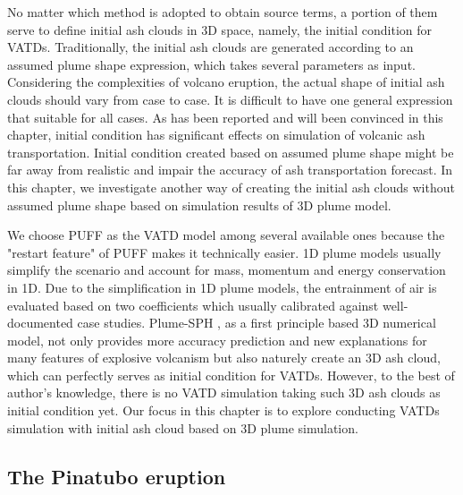 No matter which method is adopted to obtain source terms, a portion of them serve to define initial ash clouds in 3D space, namely, the initial condition for VATDs. Traditionally, the initial ash clouds are generated according to an assumed plume shape expression, which takes several parameters as input. Considering the complexities of volcano eruption, the actual shape of initial ash clouds should vary from case to case. It is difficult to have one general expression that suitable for all cases. As has been reported and will been convinced in this chapter, initial condition has significant effects on simulation of volcanic ash transportation. Initial condition created based on assumed plume shape might be far away from realistic and impair the accuracy of ash transportation forecast. In this chapter, we investigate another way of creating the initial ash clouds without assumed plume shape based on simulation results of 3D plume model.

We choose PUFF \citep{searcy1998puff} as the VATD model among several available ones \citep[e.g.][]{searcy1998puff,schwaiger2012ash3d} because the "restart feature" of PUFF makes it technically easier.
1D plume models \citep[e.g.][]{bursik2001effect} usually simplify the scenario and account for mass, momentum and energy conservation in 1D. Due to the simplification in 1D plume models, the entrainment of air is evaluated based on two coefficients which usually calibrated against well-documented case studies.
Plume-SPH \citep{gmd-2017-119}, as a first principle based 3D numerical model, not only provides more accuracy prediction and new explanations for many features of explosive volcanism but also naturely create an 3D ash cloud, which can perfectly serves as initial condition for VATDs. However, to the best of author's knowledge, there is no VATD simulation taking such 3D ash clouds as initial condition yet. Our focus in this chapter is to explore conducting VATDs simulation with initial ash cloud based on 3D plume simulation. 

\subsection{The Pinatubo eruption}

